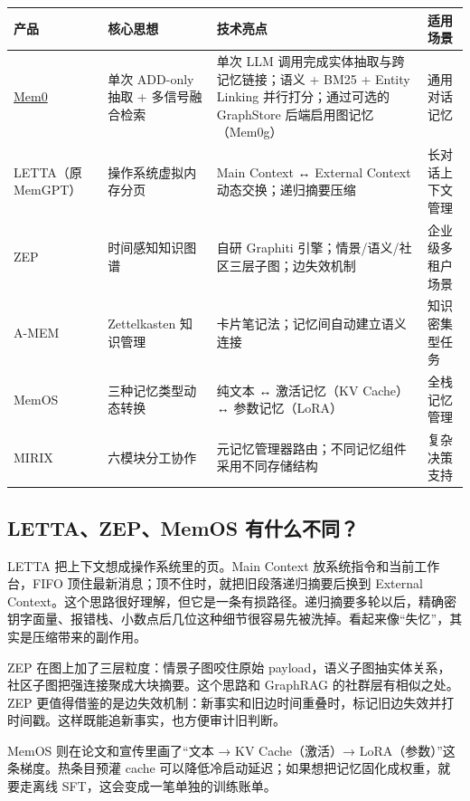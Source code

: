 \documentclass[10pt,a4paper]{ctexart}
\begin{document}
{\footnotesize
\begin{tabularx}{\textwidth}{|X|X|X|X|}
\hline
\textbf{产品} & \textbf{核心思想} & \textbf{技术亮点} & \textbf{适用场景} \\
\hline
\href{https://github.com/mem0ai/mem0}{Mem0} & 单次 ADD-only 抽取 + 多信号融合检索 & 单次 LLM 调用完成实体抽取与跨记忆链接；语义 + BM25 + Entity Linking 并行打分；通过可选的 GraphStore 后端启用图记忆（Mem0g） & 通用对话记忆 \\
\hline
LETTA（原 MemGPT） & 操作系统虚拟内存分页 & Main Context ↔ External Context 动态交换；递归摘要压缩 & 长对话上下文管理 \\
\hline
ZEP & 时间感知知识图谱 & 自研 Graphiti 引擎；情景/语义/社区三层子图；边失效机制 & 企业级多租户场景 \\
\hline
A-MEM & Zettelkasten 知识管理 & 卡片笔记法；记忆间自动建立语义连接 & 知识密集型任务 \\
\hline
MemOS & 三种记忆类型动态转换 & 纯文本 ↔ 激活记忆（KV Cache）↔ 参数记忆（LoRA） & 全栈记忆管理 \\
\hline
MIRIX & 六模块分工协作 & 元记忆管理器路由；不同记忆组件采用不同存储结构 & 复杂决策支持 \\
\hline
\end{tabularx}
}



\subsection{LETTA、ZEP、MemOS 有什么不同？}


LETTA 把上下文想成操作系统里的页。Main Context 放系统指令和当前工作台，FIFO 顶住最新消息；顶不住时，就把旧段落递归摘要后换到 External Context。这个思路很好理解，但它是一条有损路径。递归摘要多轮以后，精确密钥字面量、报错栈、小数点后几位这种细节很容易先被洗掉。看起来像“失忆”，其实是压缩带来的副作用。



ZEP 在图上加了三层粒度：情景子图咬住原始 payload，语义子图抽实体关系，社区子图把强连接聚成大块摘要。这个思路和 GraphRAG 的社群层有相似之处。ZEP 更值得借鉴的是边失效机制：新事实和旧边时间重叠时，标记旧边失效并打时间戳。这样既能追新事实，也方便审计旧判断。



MemOS 则在论文和宣传里画了“文本 → KV Cache（激活）→ LoRA（参数）”这条梯度。热条目预灌 cache 可以降低冷启动延迟；如果想把记忆固化成权重，就要走离线 SFT，这会变成一笔单独的训练账单。
\end{document}
